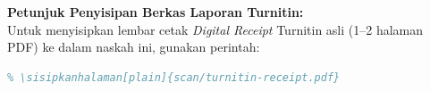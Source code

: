 \vspace{1\baselineskip}
\noindent\textbf{Petunjuk Penyisipan Berkas Laporan Turnitin:}\\
Untuk menyisipkan lembar cetak \textit{Digital Receipt} Turnitin asli (1--2 halaman PDF) ke dalam naskah ini, gunakan perintah:
\begin{lstlisting}[language=TeX,caption={Penyisipan Laporan Turnitin Menggunakan pdfpages}]
% Sisipkan halaman PDF bukti receipt Turnitin setelah tabel di atas:
% \sisipkanhalaman[plain]{scan/turnitin-receipt.pdf}
\end{lstlisting}
